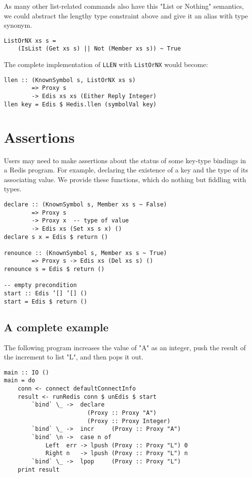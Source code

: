 \documentclass[pldi]{sigplanconf-pldi16}
\begin{document}
As many other list-related commands also have this "List or Nothing" semantics,
 we could abstract the lengthy type constraint above and give it an alias with
 type synonym.

\begin{verbatim}
ListOrNX xs s =
    (IsList (Get xs s) || Not (Member xs s)) ~ True
\end{verbatim}

The complete implementation of \texttt{LLEN} with
\texttt{ListOrNX} would become:

\begin{verbatim}
llen :: (KnownSymbol s, ListOrNX xs s)
        => Proxy s
        -> Edis xs xs (Either Reply Integer)
llen key = Edis $ Hedis.llen (symbolVal key)
\end{verbatim}

\section{Assertions}

Users may need to make assertions about the status of some key-type bindings in
 a Redis program. For example, declaring the existence of a key and the type
 of its associating value. We provide these functions, which do nothing but
 fiddling with types.

\begin{verbatim}
declare :: (KnownSymbol s, Member xs s ~ False)
        => Proxy s
        -> Proxy x  -- type of value
        -> Edis xs (Set xs s x) ()
declare s x = Edis $ return ()

renounce :: (KnownSymbol s, Member xs s ~ True)
        => Proxy s -> Edis xs (Del xs s) ()
renounce s = Edis $ return ()

-- empty precondition
start :: Edis ’[] ’[] ()
start = Edis $ return ()
\end{verbatim}

\subsection{A complete example}

The following program increases the value of "A" as an integer, push the result
 of the increment to list "L", and then pops it out.

\begin{verbatim}
main :: IO ()
main = do
    conn <- connect defaultConnectInfo
    result <- runRedis conn $ unEdis $ start
        `bind` \_ ->  declare
                        (Proxy :: Proxy "A")
                        (Proxy :: Proxy Integer)
        `bind` \_ ->  incr     (Proxy :: Proxy "A")
        `bind` \n ->  case n of
            Left  err -> lpush (Proxy :: Proxy "L") 0
            Right n   -> lpush (Proxy :: Proxy "L") n
        `bind` \_ ->  lpop     (Proxy :: Proxy "L")
    print result
\end{verbatim}
\end{document}
